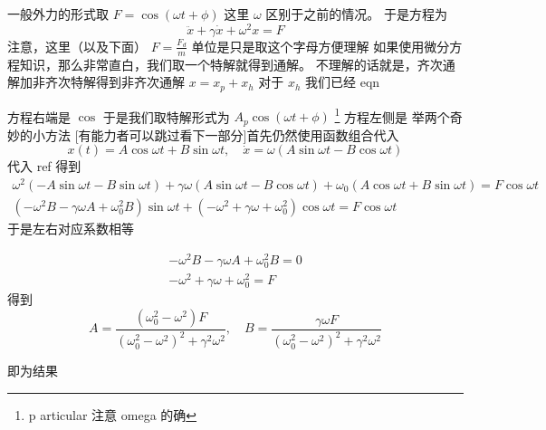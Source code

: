 \documentclass[11pt]{book}
\begin{document}
一般外力的形式取 \(F=\cos (\omega t+\phi)\) 这里 \(\omega\) 区别于之前的情况。
于是方程为
\begin{equation}
\label{eq:61}
\ddot{x}+\gamma \dot{x}+\omega^{2} x=F
\end{equation}
注意，这里（以及下面） \(F=\frac{F_d}{m}\) 单位是只是取这个字母方便理解
如果使用微分方程知识，那么非常直白，我们取一个特解就得到通解。
不理解的话就是，齐次通解加非齐次特解得到非齐次通解
\(x=x_p+x_h\)
对于 \(x_h\) 我们已经
eqn

方程右端是 \(\cos\) 于是我们取特解形式为 \(A_p\cos (\omega t +\phi)\)
\footnote{ p articular 注意 omega 的确}
方程左侧是
举两个奇妙的小方法
[有能力者可以跳过看下一部分]首先仍然使用函数组合代入
\begin{equation}
\label{eq:60}
x(t)=A\cos\omega t+B\sin\omega t,\quad \dot{x}=\omega(A\sin\omega t-B\cos \omega t)
\end{equation}
代入
ref
得到
\begin{equation}
\label{eq:62}
\begin{split}
\omega^2(-A\sin\omega t-B\sin\omega t)+\gamma\omega(A\sin\omega t-B\cos \omega t)+\omega_0(A\cos\omega t+B\sin\omega t)=F\cos\omega t\\
(-\omega^2B-\gamma\omega A+\omega^2_0B)\sin\omega t+(-\omega^2+\gamma\omega+\omega^2_0)\cos\omega t=F\cos \omega t
\end{split}
\end{equation}
于是左右对应系数相等

\begin{align*}
\label{eq:64}
-\omega^2B-\gamma\omega A+\omega^2_0B=0 \\
-\omega^2+\gamma\omega+\omega^2_0=F
\end{align*}
得到
\begin{equation}
\label{eq:65}
A=\frac{(\omega_0^2-\omega^2)F}{(\omega_0^2-\omega^2)^2+\gamma^2\omega^2},\quad B=\frac{\gamma\omega F}{(\omega_0^2-\omega^2)^2+\gamma^2\omega^2}
\end{equation}

即为结果
\end{document}
